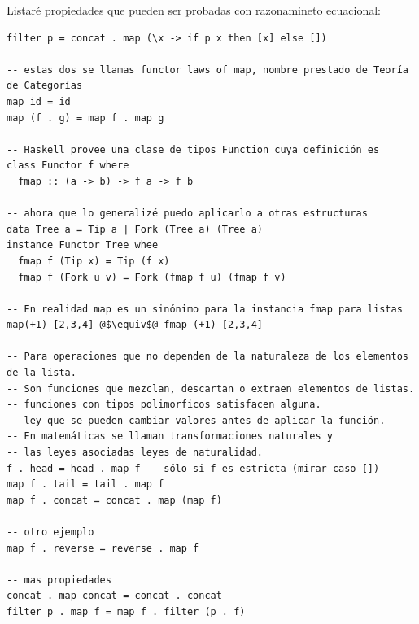\documentclass[12pt]{extarticle}
\begin{document}
Listaré propiedades que pueden ser probadas con razonamineto ecuacional:
\begin{verbatim}
filter p = concat . map (\x -> if p x then [x] else [])

-- estas dos se llamas functor laws of map, nombre prestado de Teoría de Categorías
map id = id
map (f . g) = map f . map g

-- Haskell provee una clase de tipos Function cuya definición es
class Functor f where
  fmap :: (a -> b) -> f a -> f b

-- ahora que lo generalizé puedo aplicarlo a otras estructuras
data Tree a = Tip a | Fork (Tree a) (Tree a)
instance Functor Tree whee
  fmap f (Tip x) = Tip (f x)
  fmap f (Fork u v) = Fork (fmap f u) (fmap f v)

-- En realidad map es un sinónimo para la instancia fmap para listas
map(+1) [2,3,4] @$\equiv$@ fmap (+1) [2,3,4]

-- Para operaciones que no dependen de la naturaleza de los elementos de la lista.
-- Son funciones que mezclan, descartan o extraen elementos de listas.
-- funciones con tipos polimorficos satisfacen alguna.
-- ley que se pueden cambiar valores antes de aplicar la función.
-- En matemáticas se llaman transformaciones naturales y 
-- las leyes asociadas leyes de naturalidad.
f . head = head . map f -- sólo si f es estricta (mirar caso [])
map f . tail = tail . map f
map f . concat = concat . map (map f)

-- otro ejemplo
map f . reverse = reverse . map f

-- mas propiedades
concat . map concat = concat . concat
filter p . map f = map f . filter (p . f)
\end{verbatim}
\end{document}
